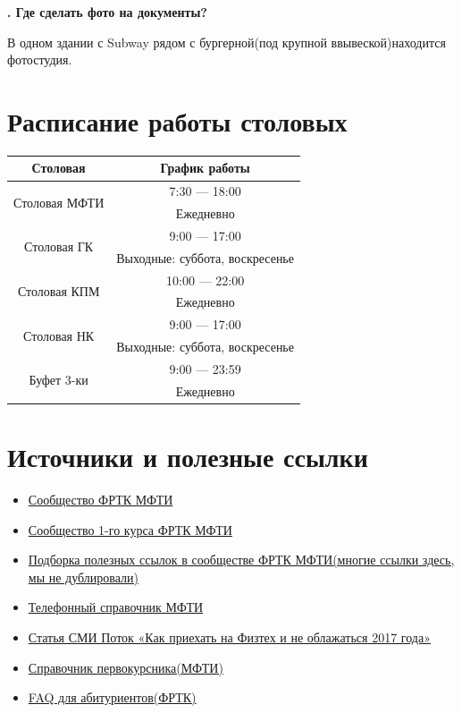 \documentclass[14pt]{extarticle}
\newcounter{question}
\newcommand\Que[1]{%
    \begin{minipage}{\textwidth}
    \leavevmode\par
    \stepcounter{question}
    \noindent
    {\large\textbf{\thequestion. #1}}\par}
\newcommand\Ans[2][]{%
    \leavevmode\par\noindent
    {\leftskip37pt
    \textbf{#1}#2\par}
    \end{minipage}}
\begin{document}
\Que{Где сделать фото на документы?}
\Ans{В одном здании с Subway рядом с бургерной(под крупной ввывеской)находится фотостудия.}
\clearpage
\section{Расписание работы столовых}
\begin{center}
\begin{tabular}{ |c|c| }
\hline
\textbf{Столовая} & \textbf{График работы} \\ \hline

\multirow{2}{*}{Столовая МФТИ}
& 7:30 — 18:00 \\
& Ежедневно \\ \hline

\multirow{2}{*}{Столовая ГК}
& 9:00 — 17:00 \\
& Выходные: суббота, воскресенье \\ \hline

\multirow{2}{*}{Столовая КПМ}
& 10:00 — 22:00 \\
& Ежедневно \\ \hline

\multirow{2}{*}{Столовая НК}
& 9:00 — 17:00 \\
& Выходные: суббота, воскресенье \\ \hline

\multirow{2}{*}{Буфет 3-ки}
& 9:00 — 23:59 \\
& Ежедневно \\
\hline
\end{tabular}
\end{center}
\clearpage
\section{Источники и полезные ссылки}
\begin{itemize}
    \item \href{https://vk.com/drec_mipt}{Сообщество ФРТК МФТИ}
    \item \href{https://vk.com/drec_81x}{Сообщество 1-го курса ФРТК МФТИ}
    \item \href{https://vk.com/page-17708_53431599}{Подборка полезных ссылок в сообществе ФРТК МФТИ(многие ссылки здесь, мы не дублировали)}
    \item \href{https://mipt.ru/about/general/contacts/phones.php}{Телефонный справочник МФТИ}
    \item \href{http://miptstream.ru/2017/08/22/how_not_to_screw_up_3/}{Статья СМИ Поток «Как приехать на Физтех и не облажаться 2017 года»}
    \item \href{https://mipt.ru/students/1kurs.php}{Справочник первокурсника(МФТИ)}
    \item \href{https://mipt.ru/drec/abitur/faq.php}{FAQ для абитуриентов(ФРТК)}
\end{itemize}
\end{document}
